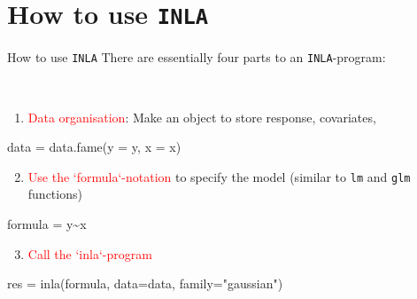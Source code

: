 \documentclass[
  ignorenonframetext,
]{beamer}
\newenvironment{Shaded}{\begin{snugshade}}{\end{snugshade}}
\newcommand{\AttributeTok}[1]{\textcolor[rgb]{0.77,0.63,0.00}{#1}}
\newcommand{\FunctionTok}[1]{\textcolor[rgb]{0.00,0.00,0.00}{#1}}
\newcommand{\NormalTok}[1]{#1}
\newcommand{\OtherTok}[1]{\textcolor[rgb]{0.56,0.35,0.01}{#1}}
\newcommand{\SpecialCharTok}[1]{\textcolor[rgb]{0.00,0.00,0.00}{#1}}
\newcommand{\StringTok}[1]{\textcolor[rgb]{0.31,0.60,0.02}{#1}}
\providecommand{\tightlist}{%
  \setlength{\itemsep}{0pt}\setlength{\parskip}{0pt}}
\begin{document}
\hypertarget{how-to-use-inla}{%
\section{\texorpdfstring{How to use
\texttt{INLA}}{How to use INLA}}\label{how-to-use-inla}}

\begin{frame}[fragile]{How to use \texttt{INLA}}
\protect\hypertarget{how-to-use-inla-1}{}
There are essentially four parts to an \texttt{INLA}-program:\\
\strut \\

\begin{enumerate}
\tightlist
\item
  \textcolor{red}{Data organisation}: Make an object to store response,
  covariates,
\end{enumerate}

\begin{Shaded}
\begin{Highlighting}[]
\NormalTok{data }\OtherTok{=} \FunctionTok{data.fame}\NormalTok{(}\AttributeTok{y =}\NormalTok{ y, }\AttributeTok{x =}\NormalTok{ x)}
\end{Highlighting}
\end{Shaded}

\begin{enumerate}
\setcounter{enumi}{1}
\tightlist
\item
  \textcolor{red}{Use the `formula`-notation} to specify the model
  (similar to \texttt{lm} and \texttt{glm} functions)
\end{enumerate}

\begin{Shaded}
\begin{Highlighting}[]
\NormalTok{formula }\OtherTok{=}\NormalTok{ y}\SpecialCharTok{\textasciitilde{}}\NormalTok{x}
\end{Highlighting}
\end{Shaded}

\begin{enumerate}
\setcounter{enumi}{2}
\tightlist
\item
  \textcolor{red}{Call the `inla`-program}
\end{enumerate}

\begin{Shaded}
\begin{Highlighting}[]
\NormalTok{res }\OtherTok{=} \FunctionTok{inla}\NormalTok{(formula, }\AttributeTok{data=}\NormalTok{data, }\AttributeTok{family=}\StringTok{"gaussian"}\NormalTok{)}
\end{Highlighting}
\end{Shaded}


\end{frame}
\end{document}
